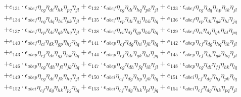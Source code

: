 \begin{itemize}
\begin{align}
    & + e_{131} \cdot \epsilon_{a b e f} \eta_{c g} \eta_{d i} \eta_{h k} \eta_{p q} \eta_{j l} + e_{132} \cdot \epsilon_{a b e f} \eta_{c g} \eta_{d i} \eta_{h q} \eta_{p k} \eta_{j l} + e_{133} \cdot \epsilon_{a b e f} \eta_{c g} \eta_{d q} \eta_{h p} \eta_{i k} \eta_{j l} \nonumber \\
    & + e_{134} \cdot \epsilon_{a b e f} \eta_{c g} \eta_{d q} \eta_{h i} \eta_{p k} \eta_{j l} + e_{135} \cdot \epsilon_{a b e f} \eta_{c p} \eta_{d i} \eta_{g j} \eta_{h k} \eta_{l q} + e_{136} \cdot \epsilon_{a b e f} \eta_{c p} \eta_{d i} \eta_{g k} \eta_{h l} \eta_{j q} \nonumber \\
    & + e_{137} \cdot \epsilon_{a b e f} \eta_{c p} \eta_{d i} \eta_{g k} \eta_{h q} \eta_{j l} + e_{138} \cdot \epsilon_{a b e f} \eta_{c i} \eta_{d j} \eta_{g p} \eta_{h k} \eta_{l q} + e_{139} \cdot \epsilon_{a b e f} \eta_{c i} \eta_{d j} \eta_{g k} \eta_{h l} \eta_{p q} \nonumber \\
    & + e_{140} \cdot \epsilon_{a b e f} \eta_{c i} \eta_{d k} \eta_{g p} \eta_{h j} \eta_{l q} + e_{141} \cdot \epsilon_{a b e p} \eta_{c f} \eta_{d g} \eta_{h i} \eta_{j k} \eta_{l q} + e_{142} \cdot \epsilon_{a b e p} \eta_{c f} \eta_{d g} \eta_{h q} \eta_{i k} \eta_{j l} \nonumber \\
    & + e_{143} \cdot \epsilon_{a b e p} \eta_{c f} \eta_{d i} \eta_{g j} \eta_{h k} \eta_{l q} + e_{144} \cdot \epsilon_{a b e p} \eta_{c f} \eta_{d i} \eta_{g k} \eta_{h l} \eta_{j q} + e_{145} \cdot \epsilon_{a b e p} \eta_{c f} \eta_{d i} \eta_{g k} \eta_{h q} \eta_{j l} \nonumber \\
    & + e_{146} \cdot \epsilon_{a b e p} \eta_{c g} \eta_{d h} \eta_{f i} \eta_{j k} \eta_{l q} + e_{147} \cdot \epsilon_{a b e p} \eta_{c g} \eta_{d h} \eta_{f q} \eta_{i k} \eta_{j l} + e_{148} \cdot \epsilon_{a b e p} \eta_{c g} \eta_{d i} \eta_{f j} \eta_{h k} \eta_{l q} \nonumber \\
    & + e_{149} \cdot \epsilon_{a b e p} \eta_{c g} \eta_{d i} \eta_{f k} \eta_{h q} \eta_{j l} + e_{150} \cdot \epsilon_{a b e i} \eta_{c f} \eta_{d g} \eta_{h p} \eta_{j k} \eta_{l q} + e_{151} \cdot \epsilon_{a b e i} \eta_{c f} \eta_{d g} \eta_{h j} \eta_{p k} \eta_{l q} \nonumber \\
    & + e_{152} \cdot \epsilon_{a b e i} \eta_{c f} \eta_{d g} \eta_{h k} \eta_{p j} \eta_{l q} + e_{153} \cdot \epsilon_{a b e i} \eta_{c f} \eta_{d g} \eta_{h k} \eta_{p l} \eta_{j q} + e_{154} \cdot \epsilon_{a b e i} \eta_{c f} \eta_{d g} \eta_{h k} \eta_{p q} \eta_{j l} \nonumber \\

\end{align}
\end{itemize}
